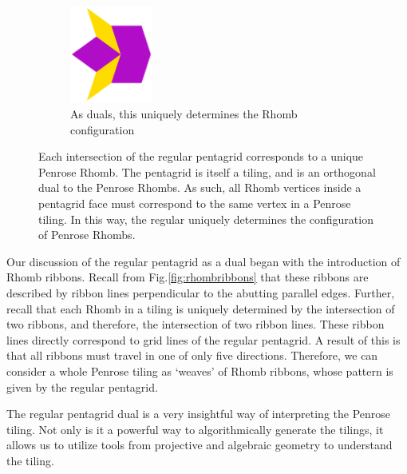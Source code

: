 \documentclass[
  oneside,
  11pt, a4paper,
  footinclude=true,
  headinclude=true,
  cleardoublepage=empty
]{scrbook}
\begin{document}
\begin{figure}[H]
\begin{subfigure}[b]{\textwidth}
\centering
\includegraphics[width=0.3\textwidth]{RhombConstructed}
\caption{As duals, this uniquely determines the Rhomb configuration}
\end{subfigure}
\caption[Construction of Penrose Tiling from Pentagrid Dual]{Each intersection of the regular pentagrid corresponds to a unique Penrose Rhomb. The pentagrid is itself a tiling, and is an orthogonal dual to the Penrose Rhombs. As such, all Rhomb vertices inside a pentagrid face must correspond to the same vertex in a Penrose tiling. In this way, the regular uniquely determines the configuration of Penrose Rhombs.}
\label{fig:pentagridconstruction}
\end{figure}

Our discussion of the regular pentagrid as a dual began with the introduction of Rhomb ribbons. Recall from Fig.\ref{fig:rhombribbons} that these ribbons are described by ribbon lines perpendicular to the abutting parallel edges. Further, recall that each Rhomb in a tiling is uniquely determined by the intersection of two ribbons, and therefore, the intersection of two ribbon lines. These ribbon lines directly correspond to grid lines of the regular pentagrid. A result of this is that all ribbons must travel in one of only five directions. Therefore, we can consider a whole Penrose tiling as `weaves' of Rhomb ribbons, whose pattern is given by the regular pentagrid. 

The regular pentagrid dual is a very insightful way of interpreting the Penrose tiling. Not only is it a powerful way to algorithmically generate the tilings, it allows us to utilize tools from projective and algebraic geometry to understand the tiling.
\end{document}
